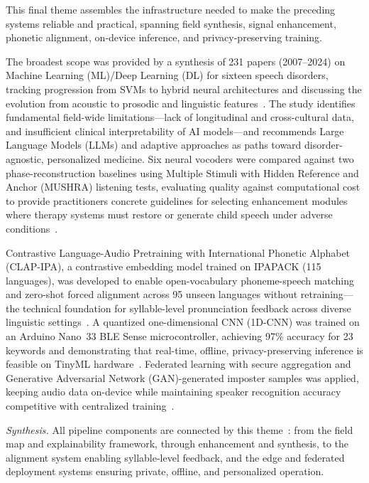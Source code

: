\documentclass[conference]{IEEEtran}
\begin{document}
This final theme assembles the infrastructure needed to make the preceding systems reliable and practical, spanning field synthesis, signal enhancement, phonetic alignment, on-device inference, and privacy-preserving training.

The broadest scope was provided by a synthesis of 231 papers (2007--2024) on Machine Learning (ML)/Deep Learning (DL) for sixteen speech disorders, tracking progression from SVMs to hybrid neural architectures and discussing the evolution from acoustic to prosodic and linguistic features~\cite{ref20}. The study identifies fundamental field-wide limitations---lack of longitudinal and cross-cultural data, and insufficient clinical interpretability of AI models---and recommends Large Language Models (LLMs) and adaptive approaches as paths toward disorder-agnostic, personalized medicine. Six neural vocoders were compared against two phase-reconstruction baselines using Multiple Stimuli with Hidden Reference and Anchor (MUSHRA) listening tests, evaluating quality against computational cost to provide practitioners concrete guidelines for selecting enhancement modules where therapy systems must restore or generate child speech under adverse conditions~\cite{ref21}.

Contrastive Language-Audio Pretraining with International Phonetic Alphabet (CLAP-IPA), a contrastive embedding model trained on IPAPACK (115 languages), was developed to enable open-vocabulary phoneme-speech matching and zero-shot forced alignment across 95 unseen languages without retraining---the technical foundation for syllable-level pronunciation feedback across diverse linguistic settings~\cite{ref22}. A quantized one-dimensional CNN (1D-CNN) was trained on an Arduino Nano~33 BLE Sense microcontroller, achieving 97\% accuracy for 23 keywords and demonstrating that real-time, offline, privacy-preserving inference is feasible on TinyML hardware~\cite{ref23}. Federated learning with secure aggregation and Generative Adversarial Network (GAN)-generated imposter samples was applied, keeping audio data on-device while maintaining speaker recognition accuracy competitive with centralized training~\cite{ref24}.

\emph{Synthesis.} All pipeline components are connected by this theme~\cite{ref20,ref21,ref22,ref23,ref24}: from the field map and explainability framework, through enhancement and synthesis, to the alignment system enabling syllable-level feedback, and the edge and federated deployment systems ensuring private, offline, and personalized operation.
\end{document}
